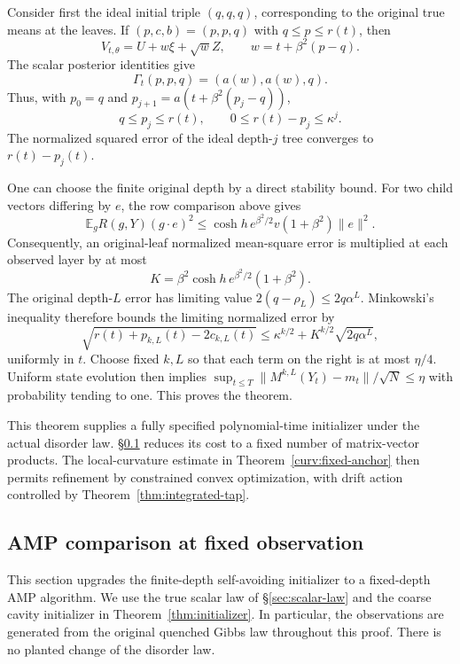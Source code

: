 \documentclass[11pt,reqno]{amsart}
\begin{document}
Consider first the ideal initial triple $(q,q,q)$, corresponding to the
original true means at the leaves. If $(p,c,b)=(p,p,q)$ with $q\le p\le r(t)$,
then
\[
 V_{t,\theta}=U+w\xi+\sqrt w Z,\qquad
 w=t+\beta^2(p-q).
\]
The scalar posterior identities give
\[
 \Gamma_t(p,p,q)=(a(w),a(w),q).
\]
Thus, with $p_0=q$ and
$p_{j+1}=a(t+\beta^2(p_j-q))$,
\[
 q\le p_j\le r(t),\qquad
 0\le r(t)-p_j\le\kappa^j.
\]
The normalized squared error of the ideal depth-$j$ tree converges to
$r(t)-p_j(t)$.

One can choose the finite original depth by a direct stability bound.
For two child vectors differing by $e$, the row comparison above gives
\[
 \mathbb E_gR(g,Y)(g\cdot e)^2
 \le \cosh h\,e^{\beta^2/2}v(1+\beta^2)\|e\|^2.
\]
Consequently, an original-leaf normalized mean-square error is multiplied
at each observed layer by at most
\[
 K=\beta^2\cosh h\,e^{\beta^2/2}(1+\beta^2).
\]
The original depth-$L$ error has limiting value
$2(q-\rho_L)\le2q\alpha^L$.
Minkowski's inequality therefore bounds the limiting normalized error by
\[
 \sqrt{r(t)+p_{k,L}(t)-2c_{k,L}(t)}
 \le \kappa^{k/2}+K^{k/2}\sqrt{2q\alpha^L},
\]
uniformly in $t$.
Choose fixed $k,L$ so that each term on the right is at most $\eta/4$.
Uniform state evolution then implies
$\sup_{t\le T}\|M^{k,L}(Y_t)-m_t\|/\sqrt N\le\eta$ with probability
tending to one. This proves the theorem.

This theorem supplies a fully specified polynomial-time initializer under
the actual disorder law. \S\ref{sec:amp} reduces its cost to a fixed
number of matrix-vector products. The local-curvature estimate in
Theorem~\ref{curv:fixed-anchor} then permits refinement by constrained
convex optimization, with drift action controlled by
Theorem~\ref{thm:integrated-tap}.


\subsection{AMP comparison at fixed observation}\label{sec:amp}

This section upgrades the finite-depth self-avoiding initializer to a
fixed-depth AMP algorithm.  We use the true scalar law of
\S\ref{sec:scalar-law} and the coarse cavity initializer in
Theorem~\ref{thm:initializer}.  In particular, the observations are generated
from the original quenched Gibbs law throughout this proof.  There is no
planted change of the disorder law.
\end{document}
